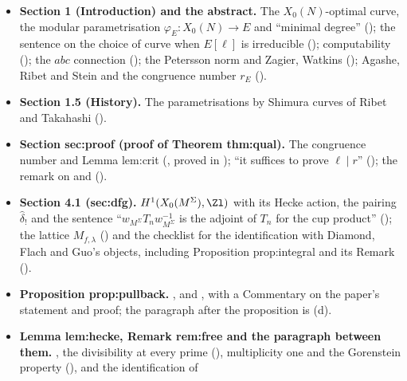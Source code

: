 \begin{itemize}
\item \textbf{Section 1 (Introduction) and the abstract.} The $X_0(N)$-optimal curve, the modular parametrisation
$\varphi_E\colon X_0(N)\to E$ and ``minimal degree'' ();
the sentence on the choice of curve when $E[\ell]$ is irreducible (); computability
(); the $abc$ connection (); the Petersson norm and Zagier, Watkins
(); Agashe, Ribet and Stein and the congruence number $r_E$
().
\item \textbf{Section 1.5 (History).} The parametrisations by Shimura curves of Ribet and Takahashi
().
\item \textbf{Section sec:proof (proof of Theorem thm:qual).} The congruence number and Lemma lem:crit (, proved in
); ``it suffices to prove $\ell\mid r$'' (); the remark on  and 
().
\item \textbf{Section 4.1 (sec:dfg).} $H^1(X_0(M^\Sigma),\Zl)$ with its Hecke action, the pairing $\hat\delta_!$ and the sentence
``$w_{M^\Sigma}T_nw_{M^\Sigma}^{-1}$ is the adjoint of $T_n$ for the cup product'' (); the
lattice $M_{f,\lambda}$ () and the checklist for the identification with Diamond, Flach and Guo's objects, including Proposition prop:integral and its
Remark ().
\item \textbf{Proposition prop:pullback.} ,  and , with a
Commentary on the paper's statement and proof; the paragraph after the proposition is (d).
\item \textbf{Lemma lem:hecke, Remark rem:free and the paragraph between them.} , the divisibility at every prime
(), multiplicity one and the Gorenstein property
(), and the identification of

\end{itemize}
